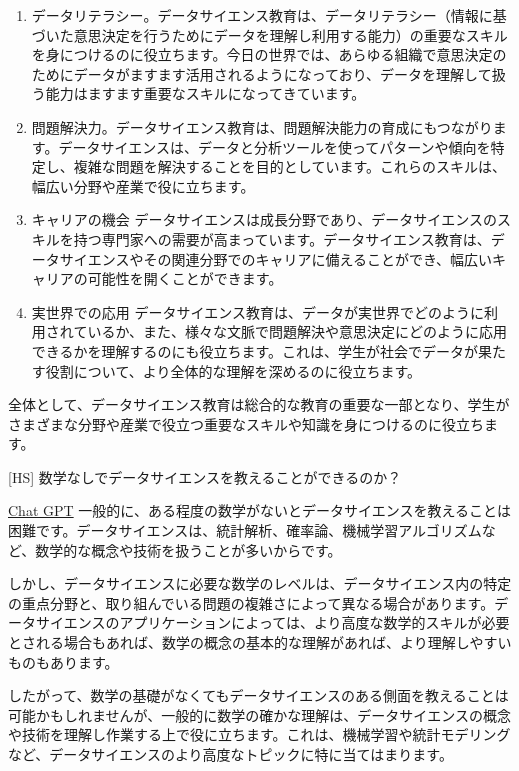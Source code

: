 \documentclass[
]{bxjsbook}
\theoremstyle{definition}
\theoremstyle{definition}
\theoremstyle{definition}
\theoremstyle{definition}
\theoremstyle{remark}
\begin{document}
\begin{enumerate}
\def\labelenumi{\arabic{enumi}.}
\item
  データリテラシー。データサイエンス教育は、データリテラシー（情報に基づいた意思決定を行うためにデータを理解し利用する能力）の重要なスキルを身につけるのに役立ちます。今日の世界では、あらゆる組織で意思決定のためにデータがますます活用されるようになっており、データを理解して扱う能力はますます重要なスキルになってきています。
\item
  問題解決力。データサイエンス教育は、問題解決能力の育成にもつながります。データサイエンスは、データと分析ツールを使ってパターンや傾向を特定し、複雑な問題を解決することを目的としています。これらのスキルは、幅広い分野や産業で役に立ちます。
\item
  キャリアの機会 データサイエンスは成長分野であり、データサイエンスのスキルを持つ専門家への需要が高まっています。データサイエンス教育は、データサイエンスやその関連分野でのキャリアに備えることができ、幅広いキャリアの可能性を開くことができます。
\item
  実世界での応用 データサイエンス教育は、データが実世界でどのように利用されているか、また、様々な文脈で問題解決や意思決定にどのように応用できるかを理解するのにも役立ちます。これは、学生が社会でデータが果たす役割について、より全体的な理解を深めるのに役立ちます。
\end{enumerate}

全体として、データサイエンス教育は総合的な教育の重要な一部となり、学生がさまざまな分野や産業で役立つ重要なスキルや知識を身につけるのに役立ちます。

{[}HS{]} 数学なしでデータサイエンスを教えることができるのか？

\protect\hyperlink{chatgpt}{Chat GPT} 一般的に、ある程度の数学がないとデータサイエンスを教えることは困難です。データサイエンスは、統計解析、確率論、機械学習アルゴリズムなど、数学的な概念や技術を扱うことが多いからです。

しかし、データサイエンスに必要な数学のレベルは、データサイエンス内の特定の重点分野と、取り組んでいる問題の複雑さによって異なる場合があります。データサイエンスのアプリケーションによっては、より高度な数学的スキルが必要とされる場合もあれば、数学の概念の基本的な理解があれば、より理解しやすいものもあります。

したがって、数学の基礎がなくてもデータサイエンスのある側面を教えることは可能かもしれませんが、一般的に数学の確かな理解は、データサイエンスの概念や技術を理解し作業する上で役に立ちます。これは、機械学習や統計モデリングなど、データサイエンスのより高度なトピックに特に当てはまります。
\end{document}
